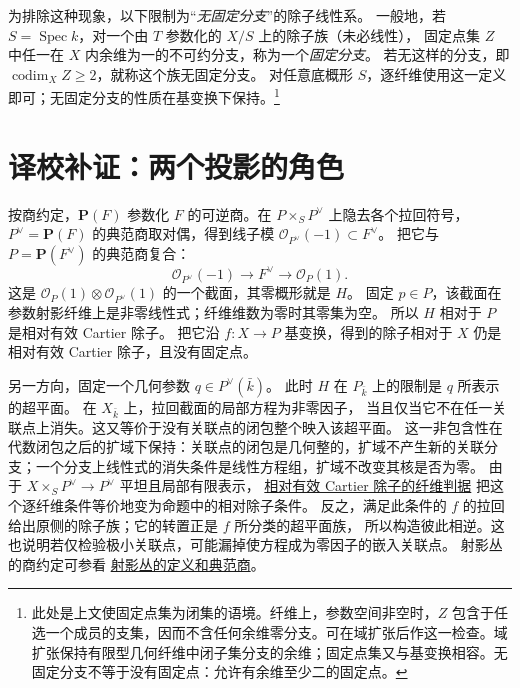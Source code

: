 \documentclass[openany,fontset=fandol]{ctexbook}
\DeclareMathOperator{\Spec}{Spec}
\newcommand{\PP}{\mathbf P}
\newcommand{\OO}{\mathcal O}
\begin{document}
为排除这种现象，以下限制为“\emph{无固定分支}”的除子线性系。
一般地，若 \(S=\Spec k\)，对一个由 \(T\) 参数化的 \(X/S\) 上的除子族（未必线性），
固定点集 \(Z\) 中任一在 \(X\) 内余维为一的不可约分支，称为一个\emph{固定分支}。
若无这样的分支，即 \(\operatorname{codim}_X Z\geq2\)，就称这个族无固定分支。
对任意底概形 \(S\)，逐纤维使用这一定义即可；无固定分支的性质在基变换下保持。\footnote{此处是上文使固定点集为闭集的语境。纤维上，参数空间非空时，\(Z\) 包含于任选一个成员的支集，因而不含任何余维零分支。可在域扩张后作这一检查。域扩张保持有限型几何纤维中闭子集分支的余维；固定点集又与基变换相容。无固定分支不等于没有固定点：允许有余维至少二的固定点。}

\section*{译校补证：两个投影的角色}
按商约定，\(\PP(F)\) 参数化 \(F\) 的可逆商。在 \(P\times_S P^\vee\) 上隐去各个拉回符号，
\(P^\vee=\PP(F)\) 的典范商取对偶，得到线子模 \(\OO_{P^\vee}(-1)\subset F^\vee\)。
把它与 \(P=\PP(F^\vee)\) 的典范商复合：
\[
 \OO_{P^\vee}(-1)\longrightarrow F^\vee
          \longrightarrow\OO_P(1).
\]
这是 \(\OO_P(1)\otimes\OO_{P^\vee}(1)\) 的一个截面，其零概形就是 \(H\)。
固定 \(p\in P\)，该截面在参数射影纤维上是非零线性式；纤维维数为零时其零集为空。
所以 \(H\) 相对于 \(P\) 是相对有效 Cartier 除子。
把它沿 \(f:X\to P\) 基变换，得到的除子相对于 \(X\) 仍是相对有效 Cartier 除子，且没有固定点。

另一方向，固定一个几何参数 \(q\in P^\vee(\bar k)\)。
此时 \(H\) 在 \(P_{\bar k}\) 上的限制是 \(q\) 所表示的超平面。
在 \(X_{\bar k}\) 上，拉回截面的局部方程为非零因子，
当且仅当它不在任一关联点上消失。这又等价于没有关联点的闭包整个映入该超平面。
这一非包含性在代数闭包之后的扩域下保持：关联点的闭包是几何整的，扩域不产生新的关联分支；一个分支上线性式的消失条件是线性方程组，扩域不改变其核是否为零。
由于 \(X\times_S P^\vee\to P^\vee\) 平坦且局部有限表示，
\href{https://stacks.math.columbia.edu/tag/056P}{相对有效 Cartier 除子的纤维判据}
把这个逐纤维条件等价地变为命题中的相对除子条件。
反之，满足此条件的 \(f\) 的拉回给出原侧的除子族；它的转置正是 \(f\) 所分类的超平面族，
所以构造彼此相逆。这也说明若仅检验极小关联点，可能漏掉使方程成为零因子的嵌入关联点。
射影丛的商约定可参看 \href{https://stacks.math.columbia.edu/tag/01OA}{射影丛的定义和典范商}。
\end{document}
